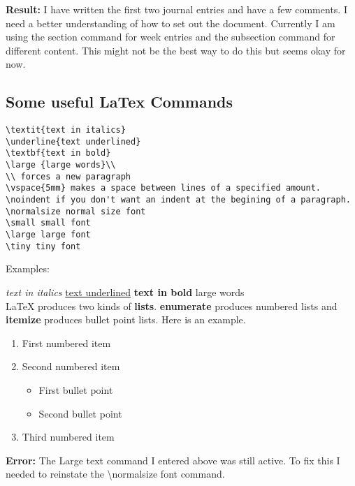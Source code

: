 \documentclass[a4paper,11pt]{article}
\begin{document}
\noindent \textbf{Result:} I have written the first two journal entries and have a few comments. I need a better understanding of how to set out the document. Currently I am using the section command for week entries and the subsection command for different content. This might not be the best way to do this but seems okay for now.\\

\subsection{Some useful LaTex Commands} 

\begin{verbatim}
\textit{text in italics} 
\underline{text underlined}
\textbf{text in bold}
\large {large words}\\
\\ forces a new paragraph
\vspace{5mm} makes a space between lines of a specified amount.
\noindent if you don't want an indent at the begining of a paragraph.
\normalsize normal size font
\small small font
\large large font
\tiny tiny font

\end{verbatim}

Examples:

\textit{text in italics} 
\underline{text underlined}
\textbf{text in bold}
\large {large words}\\

\vspace{5mm}
LaTeX produces two kinds of {\textbf{lists}}. \textbf{enumerate} produces numbered lists and \textbf{itemize} produces bullet point lists. Here is an example.
\begin{enumerate}
\item First numbered item
\item Second numbered item
\begin{itemize}
\item First bullet point
\item Second bullet point
\end{itemize}
\item Third numbered item
\end{enumerate}

\noindent \textbf{Error:} The Large text command I entered above was still active. To fix this I needed to reinstate the \textbackslash normalsize font command.

\vspace{5mm}
\end{document}
